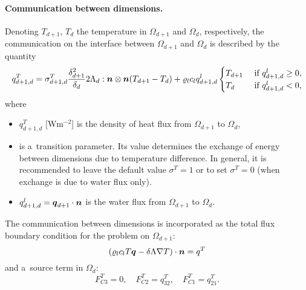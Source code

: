 \paragraph{Communication between dimensions.}
Denoting $T_{d+1}$, $T_d$ the temperature in $\Omega_{d+1}$ and $\Omega_d$, respectively, the communication on the interface between $\Omega_{d+1}$ and $\Omega_d$ is described by the quantity
\begin{equation}
  \label{e:inter_dim_flux_heat}
  q^T_{d+1,d} = \sigma^T_{d+1,d} \frac{\delta_{d+1}^2}{\delta_d}2\Lambda_d:\n\otimes\n ( T_{d+1} - T_d) + \varrho_l c_l q^l_{d+1,d}\begin{cases} T_{d+1} & \mbox{ if }q^l_{d+1,d}\ge 0,\\ T_d & \mbox{ if } q^l_{d+1,d}<0,\end{cases}
\end{equation}
where
\begin{itemize}
\item $q^T_{d+1,d}$ [W$\mathrm{m}^{-2}$] is the density of heat flux from $\Omega_{d+1}$ to $\Omega_d$,
\item {} \units{}{}{} is a~transition parameter.
Its value determines the exchange of energy between dimensions due to temperature difference.
In general, it is recommended to leave the default value $\sigma^T=1$ or to set $\sigma^T=0$ (when exchange is due to water flux only).
\item $q^l_{d+1,d}=\mathbf{\boldsymbol{q}}_{d+1}\cdot\mathbf{\boldsymbol{n}}$ is the water flux from $\Omega_{d+1}$ to $\Omega_d$.
\end{itemize}
The communication between dimensions is incorporated as the total flux boundary condition for the problem on $\Omega_{d+1}$:
\begin{equation}
\label{e:heat_FC}
\left(\varrho_l c_l T \vc q - \delta\Lambda\nabla T\right)\cdot\vc n = q^T
\end{equation}
and a~source term in $\Omega_d$:
\begin{equation}
F^T_{C3} = 0,\quad
F^T_{C2} = q^T_{32},\quad
F^T_{C1} = q^T_{21}.
\end{equation}




